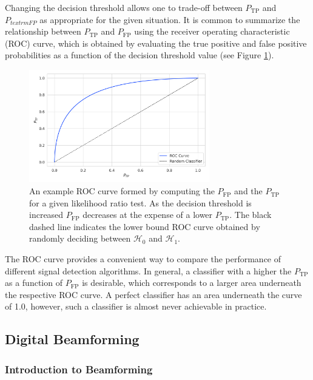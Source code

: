 Changing the decision threshold allows one to trade-off between $P_{\textrm{TP}}$ and $P_{textrm{FP}}$ as appropriate for the given situation. It is common to summarize the relationship between $P_{\textrm{TP}}$ and $P_{\textrm{FP}}$ using the receiver operating characteristic (ROC) curve, which is obtained by evaluating the true positive and false positive probabilities as a function of the decision threshold value (see Figure \ref{fig:chap4-example-roc-curve}).
\begin{figure}[htbp]
    \centering
    \includegraphics*[width=0.7\textwidth]{figs/Chapter-4/230603_roc_curve_example.png}
    \caption{\label{fig:chap4-example-roc-curve} An example ROC curve formed by computing the $P_\mathrm{FP}$ and the $P_\mathrm{TP}$ for a given likelihood ratio test. As the decision threshold is increased $P_\mathrm{FP}$ decreases at the expense of a lower $P_\mathrm{TP}$. The black dashed line indicates the lower bound ROC curve obtained by randomly deciding between $\mathcal{H}_0$ and $\mathcal{H}_1$. }
\end{figure}
The ROC curve provides a convenient way to compare the performance of different signal detection algorithms. In general, a classifier with a higher the $P_\mathrm{TP}$ as a function of $P_\mathrm{FP}$ is desirable, which corresponds to a larger area underneath the respective ROC curve. A perfect classifier has an area underneath the curve of 1.0, however, such a classifier is almost never achievable in practice. 

\subsection{Digital Beamforming}
\label{sec:chap4-dig-bf}

\subsubsection*{Introduction to Beamforming}

